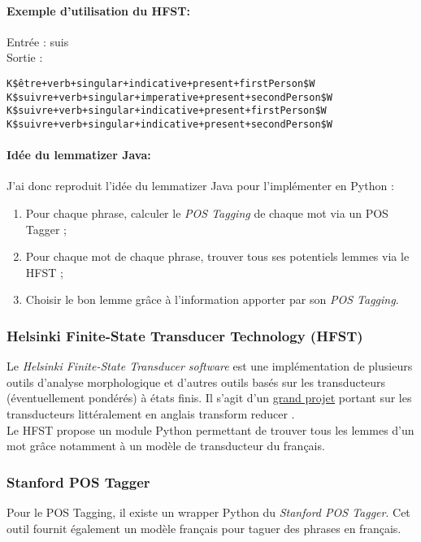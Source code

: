             \paragraph{Exemple d'utilisation du HFST:}
                Entrée : \og suis \fg\\
                Sortie :
\begin{lstlisting}
K$être+verb+singular+indicative+present+firstPerson$W
K$suivre+verb+singular+imperative+present+secondPerson$W
K$suivre+verb+singular+indicative+present+firstPerson$W
K$suivre+verb+singular+indicative+present+secondPerson$W
\end{lstlisting}

            \paragraph{Idée du lemmatizer Java:}
                J'ai donc reproduit l'idée du lemmatizer Java pour l'implémenter en Python :
                \begin{enumerate}
                    \item Pour chaque phrase, calculer le \textit{POS Tagging} de chaque mot via un POS Tagger ;
                    \item Pour chaque mot de chaque phrase, trouver tous ses potentiels lemmes via le HFST ;
                    \item Choisir le bon lemme grâce à l'information apporter par son \textit{POS Tagging}.
                \end{enumerate}

        \subsubsection{Helsinki Finite-State Transducer Technology (HFST)}
            Le \textit{Helsinki Finite-State Transducer software} est une implémentation de plusieurs outils d'analyse morphologique et d'autres outils basés sur les transducteurs (éventuellement pondérés) à états finis. Il s'agit d'un \href{http://www.ling.helsinki.fi/kieliteknologia/tutkimus/hfst/}{grand projet} portant sur les transducteurs littéralement en anglais \og transform reducer \fg.\\
            Le HFST propose un module Python permettant de trouver tous les lemmes d'un mot grâce notamment à un modèle de transducteur du français.

        \subsubsection{Stanford POS Tagger}
            Pour le POS Tagging, il existe un wrapper Python du \textit{Stanford POS Tagger}. Cet outil fournit également un modèle français pour taguer des phrases en français.

